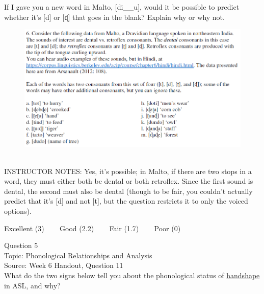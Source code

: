 \documentclass[12pt]{article}
\begin{document}
If I gave you a new word in Malto, [di\_\_u], would it be possible to predict whether it's [d] or [ɖ] that goes in the blank? Explain why or why not.\\

\begin{figure}[H]
\includegraphics{../images/malto.png}
\end{figure}

~\\
INSTRUCTOR NOTES: Yes, it's possible; in Malto, if there are two stops in a word, they must either both be dental or both retroflex. Since the first sound is dental, the second must also be dental (though to be fair, you couldn't actually predict that it's [d] and not [t], but the question restricts it to only the voiced options).


\vfill
Excellent (3) ~~~ Good (2.2) ~~~ Fair (1.7) ~~~ Poor (0)
\newpage

{\large Question 5}\\

Topic: Phonological Relationships and Analysis\\
Source: Week 6 Handout, Question 11\\

What do the two signs below tell you about the phonological status of \underline{handshape} in ASL, and why?\\
\end{document}
